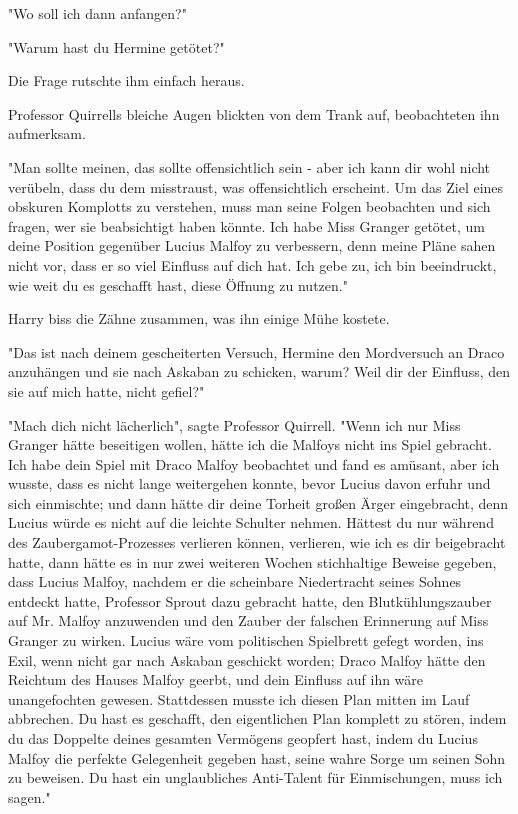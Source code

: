 {"Wo soll ich dann anfangen?"

"Warum hast du Hermine getötet?"

Die Frage rutschte ihm einfach heraus.

Professor Quirrells bleiche Augen blickten von dem Trank auf, beobachteten ihn aufmerksam.

"Man sollte meinen, das sollte offensichtlich sein - aber ich kann dir wohl nicht verübeln, dass du dem misstraust, was offensichtlich erscheint. Um das Ziel eines obskuren Komplotts zu verstehen, muss man seine Folgen beobachten und sich fragen, wer sie beabsichtigt haben könnte. Ich habe Miss Granger getötet, um deine Position gegenüber Lucius Malfoy zu verbessern, denn meine Pläne sahen nicht vor, dass er so viel Einfluss auf dich hat. Ich gebe zu, ich bin beeindruckt, wie weit du es geschafft hast, diese Öffnung zu nutzen."

Harry biss die Zähne zusammen, was ihn einige Mühe kostete.

"Das ist nach deinem gescheiterten Versuch, Hermine den Mordversuch an Draco anzuhängen und sie nach Askaban zu schicken, warum? Weil dir der Einfluss, den sie auf mich hatte, nicht gefiel?"

"Mach dich nicht lächerlich", sagte Professor Quirrell. "Wenn ich nur Miss Granger hätte beseitigen wollen, hätte ich die Malfoys nicht ins Spiel gebracht. Ich habe dein Spiel mit Draco Malfoy beobachtet und fand es amüsant, aber ich wusste, dass es nicht lange weitergehen konnte, bevor Lucius davon erfuhr und sich einmischte; und dann hätte dir deine Torheit großen Ärger eingebracht, denn Lucius würde es nicht auf die leichte Schulter nehmen. Hättest du nur während des Zaubergamot-Prozesses verlieren können, verlieren, wie ich es dir beigebracht hatte, dann hätte es in nur zwei weiteren Wochen stichhaltige Beweise gegeben, dass Lucius Malfoy, nachdem er die scheinbare Niedertracht seines Sohnes entdeckt hatte, Professor Sprout dazu gebracht hatte, den Blutkühlungszauber auf Mr. Malfoy anzuwenden und den Zauber der falschen Erinnerung auf Miss Granger zu wirken. Lucius wäre vom politischen Spielbrett gefegt worden, ins Exil, wenn nicht gar nach Askaban geschickt worden; Draco Malfoy hätte den Reichtum des Hauses Malfoy geerbt, und dein Einfluss auf ihn wäre unangefochten gewesen. Stattdessen musste ich diesen Plan mitten im Lauf abbrechen. Du hast es geschafft, den eigentlichen Plan komplett zu stören, indem du das Doppelte deines gesamten Vermögens geopfert hast, indem du Lucius Malfoy die perfekte Gelegenheit gegeben hast, seine wahre Sorge um seinen Sohn zu beweisen. Du hast ein unglaubliches Anti-Talent für Einmischungen, muss ich sagen."

}
